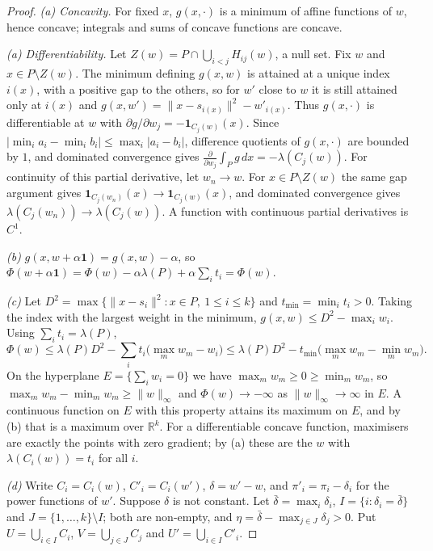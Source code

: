 \documentclass[11pt,a4paper]{article}
\theoremstyle{plain}
\theoremstyle{definition}
\theoremstyle{remark}
\newcommand{\R}{\mathbb{R}}
\newcommand{\area}{\lambda}
\newcommand{\norm}[1]{\lVert #1\rVert}
\begin{document}
\begin{proof}
\emph{(a) Concavity.} For fixed $x$, $g(x,\cdot)$ is a minimum of affine
functions of $w$, hence concave; integrals and sums of concave functions are
concave.

\emph{(a) Differentiability.} Let
$Z(w)=P\cap\bigcup_{i<j}H_{ij}(w)$, a null set. Fix $w$ and $x\in P\setminus Z(w)$.
The minimum defining $g(x,w)$ is attained at a unique index $i(x)$, with a
positive gap to the others, so for $w'$ close to $w$ it is still attained only
at $i(x)$ and $g(x,w')=\norm{x-s_{i(x)}}^2-w'_{i(x)}$. Thus $g(x,\cdot)$ is
differentiable at $w$ with
$\partial g/\partial w_j=-\mathbf 1_{C_j(w)}(x)$. Since
$\lvert\min_i a_i-\min_i b_i\rvert\le\max_i\lvert a_i-b_i\rvert$, difference
quotients of $g(x,\cdot)$ are bounded by $1$, and dominated convergence gives
$\frac{\partial}{\partial w_j}\int_P g\,dx=-\area(C_j(w))$. For continuity of
this partial derivative, let $w_n\to w$. For $x\in P\setminus Z(w)$ the same
gap argument gives $\mathbf 1_{C_j(w_n)}(x)\to\mathbf 1_{C_j(w)}(x)$, and
dominated convergence gives $\area(C_j(w_n))\to\area(C_j(w))$. A function with
continuous partial derivatives is $C^1$.

\emph{(b)} $g(x,w+\alpha\mathbf 1)=g(x,w)-\alpha$, so
$\Phi(w+\alpha\mathbf 1)=\Phi(w)-\alpha\area(P)+\alpha\sum_i t_i=\Phi(w)$.

\emph{(c)} Let $D^2=\max\{\norm{x-s_i}^2: x\in P,\ 1\le i\le k\}$ and
$t_{\min}=\min_i t_i>0$. Taking the index with the largest weight in the
minimum, $g(x,w)\le D^2-\max_i w_i$. Using $\sum_i t_i=\area(P)$,
\[
  \Phi(w)\le \area(P)D^2-\sum_i t_i\bigl(\max_m w_m-w_i\bigr)
  \le \area(P)D^2-t_{\min}\bigl(\max_m w_m-\min_m w_m\bigr).
\]
On the hyperplane $E=\{\sum_i w_i=0\}$ we have $\max_m w_m\ge 0\ge\min_m w_m$,
so $\max_m w_m-\min_m w_m\ge\norm{w}_\infty$ and $\Phi(w)\to-\infty$ as
$\norm{w}_\infty\to\infty$ in $E$. A continuous function on $E$ with this
property attains its maximum on $E$, and by (b) that is a maximum over
$\R^k$. For a differentiable concave function, maximisers are exactly the
points with zero gradient; by (a) these are the $w$ with
$\area(C_i(w))=t_i$ for all $i$.

\emph{(d)} Write $C_i=C_i(w)$, $C'_i=C_i(w')$, $\delta=w'-w$, and
$\pi'_i=\pi_i-\delta_i$ for the power functions of $w'$. Suppose $\delta$ is
not constant. Let $\bar\delta=\max_i\delta_i$,
$I=\{i:\delta_i=\bar\delta\}$ and $J=\{1,\dots,k\}\setminus I$; both are
non-empty, and $\eta=\bar\delta-\max_{j\in J}\delta_j>0$. Put
$U=\bigcup_{i\in I}C_i$, $V=\bigcup_{j\in J}C_j$ and
$U'=\bigcup_{i\in I}C'_i$.


\end{proof}
\end{document}

